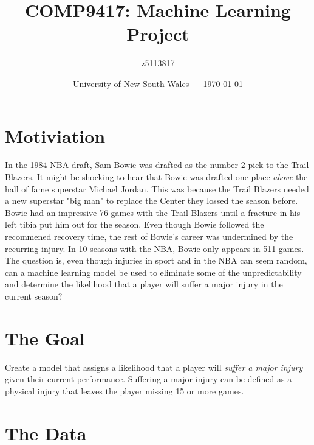 \documentclass{article}
\title{COMP9417: Machine Learning Project} %
\author{z5113817} %
\date{University of New South Wales --- \today} %
\begin{document}
\maketitle %



\section*{Motiviation}

In the 1984 NBA draft, Sam Bowie was drafted as the number 2 pick to the Trail Blazers.
It might be shocking to hear that Bowie was drafted one place \emph{above} the hall of fame superstar Michael Jordan.
This was because the Trail Blazers needed a new superstar "big man" to replace the Center they lossed the season before.
Bowie had an impressive 76 games with the Trail Blazers until a fracture in his left tibia put him out for the season.
Even though Bowie followed the recommened recovery time, the rest of Bowie's career was undermined by the recurring injury.
In 10 seasons with the NBA, Bowie only appears in 511 games.\\

The question is, even though injuries in sport and in the NBA can seem random, can a
machine learning model be used to eliminate some of the unpredictability and determine the likelihood 
that a player will suffer a major injury in the current season?

\section*{The Goal}

Create a model that assigns a likelihood that a player will \emph{suffer a major injury}
given their current performance. Suffering a major injury can be defined as a physical 
injury that leaves the player missing 15 or more games.

\newpage

\section*{The Data}
\end{document}
